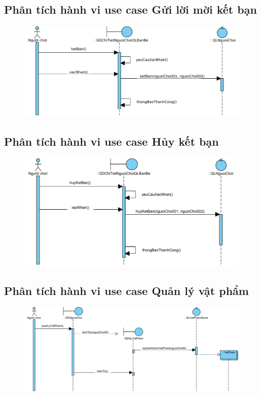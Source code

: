 \documentclass[3p]{elsarticle}
\begin{document}
\subsection{Phân tích hành vi use case Gửi lời mời kết bạn}
\begin{figure}[!htbp]
	\hspace*{-.5in}
	\centering
	\includegraphics[scale=.55]{images/sequence-pdfs/gamer/FriendManagement_Request.pdf}
\end{figure}
\subsection{Phân tích hành vi use case Hủy kết bạn}
\begin{figure}[!htbp]
	\hspace*{-.5in}
	\centering
	\includegraphics[scale=.55]{images/sequence-pdfs/gamer/FriendManagement_Unfriend.pdf}
\end{figure}
\newpage

\subsection{Phân tích hành vi use case Quản lý vật phẩm}
\begin{figure}[!htbp]
	\hspace*{-.5in}
	\centering
	\includegraphics[scale=.53]{images/sequence-pdfs/gamer/ItemManagement.pdf}
\end{figure}
\end{document}
